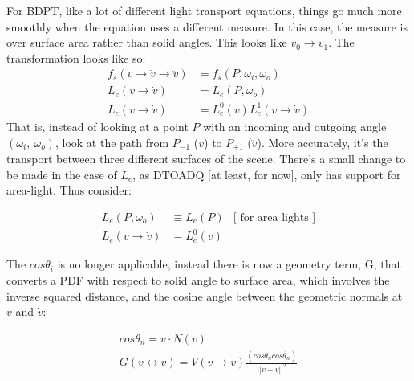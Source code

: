 \documentclass{article}
\begin{document}
  For BDPT, like a lot of different light transport equations, things go much
more smoothly when the equation uses a different measure. In this case, the
measure is over surface area rather than solid angles. This looks like $v_0
\rightarrow v_1$. The transformation looks like so:
  \begin{align}
    f_s(v \rightarrow \dot{v} \rightarrow \ddot{v}) &= f_s(P, \omega_i,
                                                      \omega_o)\\
    L_e(v \rightarrow \dot{v}) &= L_e(P, \omega_o)\\
    L_e(v \rightarrow \dot{v}) &= L_e^0(v) L_e^1(v \rightarrow \dot{v})
  \end{align}
    That is, instead of looking at a point $P$ with an incoming and outgoing
    angle $(\omega_i,\:\omega_o)$, look at the path from $P_{-1}$ ($v$) to
    $P_{+1}$ ($\ddot{v}$). More accurately, it's the transport between
    three different surfaces of the scene. There's a small change to be made in
the case of $L_e$, as DTOADQ [at least, for now], only has support for
area-light. Thus consider:

  \begin{align}
    L_e(P, \omega_o) &\equiv L_e(P) &\text{[ for area lights ]}\\
    L_e(v \rightarrow \dot{v}) &= L_e^0(v)&
  \end{align}

    The $cos\theta_i$ is no longer applicable, instead there is now a geometry
term, G, that converts a PDF with respect to solid angle to surface area, which
involves the inverse squared distance, and the cosine angle between the
geometric normals at $v$ and $\dot{v}$:

  \begin{align}
    cos\theta_n = v \cdot N(v) \\
    G(v \leftrightarrow \dot{v}) = V(v \rightarrow \dot{v})
        \frac{(cos\theta_n cos\dot{\theta_n})}{|| v - \dot{v}||^2}
  \end{align}
\end{document}
